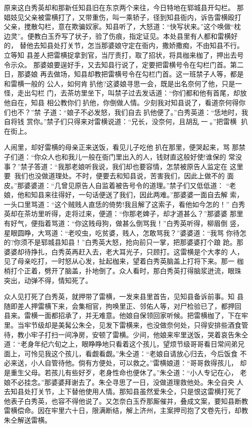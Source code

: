 原来这白秀英却和那新任知县旧在东京两个来往，今日特地在郓城县开勾栏。
那娼妓见父亲被雷横打了，又带重伤，叫一乘轿子，径到知县衙内，诉告雷横殴打
父亲，搅散勾栏，意在欺骗奴家。知县听了，大怒道：“快写状来。”这个唤做“枕
边灵”。便教白玉乔写了状子，验了伤痕，指定证见。本处县里有人都和雷横好的，
替他去知县处打关节，怎当那婆娘守定在衙内，撒娇撒痴，不由知县不行。立等知
县差人把雷横捉拿到官，当厅责打，取了招状，将具枷来枷了，押出去号令示众。
那婆娘要逞好手，又去知县行说了，定要把雷横号令在勾栏门首。第二日，那婆娘
再去做场，知县却教把雷横号令在勾栏门首。这一班禁子人等，都是和雷横一般的
公人，如何肯扒他?这婆娘寻思一会，既是出名奈何了他，只是一怪，走出勾栏
门，去茶坊里坐下，叫禁子过去发话道：“你们都和他有首尾，却放他自在，知县
相公教你们扒他，你倒做人情。少刻我对知县说了，看道奈何得你们也不？”禁
子道：“娘子不必发怒，我们自去扒他便了。”白秀英道：“恁地时，我自将钱
赏你。”禁子们只得来对雷横说道：“兄长，没奈何，且胡乱一。”把雷横
扒在街上。

人闹里，却好雷横的母亲正来送饭，看见儿子吃他扒在那里，便哭起来，骂
那禁子们道：“你众人也和我儿一般在衙门里出入的人，钱财直这般好使!谁保的
常没事？”禁子答道：“我那老娘听我说，我们却也要容情，怎禁被原告人监定在
这里要，我们也没做道理处。不时，便要去和知县说，苦害我们，因此上做不的
面皮。”那婆婆道：“几曾见原告人自监着被告号令的道理。”禁子们又低低道：
“老娘，他和知县来往得好，一句话便送了我们，因此两难。”那婆婆一面自去解
索，一头口里骂道：“这个贼贱人直恁的倚势!我且解了这索子，看他如今怎的！”
白秀英却在茶坊里听得，走将过来，便道：“你那老婢子，却才道甚么？”那婆婆
那里有好气，便指着骂道：“你这贱母狗，做甚么倒骂我！”白秀英听得，柳眉倒
竖，星眼圆睁，大骂道：“老咬虫，吃贫婆，贱人，怎敢骂我？”婆婆道：“我骂
你待怎的?你须不是郓城县知县！”白秀英大怒，抢向前只一掌，把那婆婆打个踉
跄。那婆婆却待挣扎，白秀英再赶入去，老大耳光子，只顾打。这雷横是个大孝的
人，见了母亲吃打，一时怒从心发，扯起枷来，望着白秀英脑盖上打将下来。那一
枷梢打个正着，劈开了脑盖，扑地倒了。众人看时，那白秀英打得脑浆迸流，眼珠
突出，动弹不得，情知死了。

众人见打死了白秀英，就押带了雷横，一发来县里首告，见知县备诉前事。知
县随即差人押雷横下来，会集相官，拘唤里正、邻佑人等，对尸检验已了，都押回
县来。雷横一面都招承了，并无难意。他娘自保领回家听候。把雷横枷了，下在牢
里。当牢节级却是美髯公朱仝，见发下雷横来，也没做奈何处，只得安排些酒食管
待，教小牢子打扫一间净房，安顿了雷横。少间，他娘来牢里送饭，哭着哀告朱仝
道：“老身年纪六旬之上，眼睁睁地只看着这个孩儿，望烦节级哥哥看日常间弟兄
面上，可怜见我这个孩儿，看觑看觑。”朱仝道：“老娘自请放心归去，今后饭食
不必来送，小人自管待他。倘有方便处，可以救之。”雷横娘道：“哥哥救得孩儿，
却是重生父母。若孩儿有些好歹，老身性命也便休了。”朱仝道：“小人专记在心，
老娘不必挂念。”那婆婆拜谢去了。朱仝寻思了一日，没做道理救他处。朱仝自央
人去知县处打关节，上下替他使用人情。那知县虽然爱朱仝，只是恨这雷横打死了
他表子白秀英，也容不得他说了。又怎奈白玉乔那厮催并，叠成文案，要知县断教
雷横偿命。因在牢里六十日，限满断结，解上济州，主案押司抱了文卷先行，却教
朱仝解送雷横。

